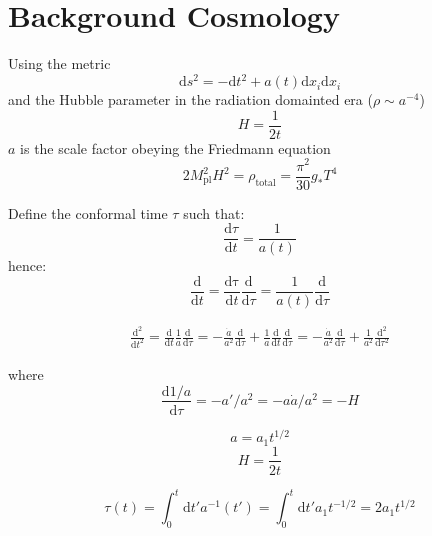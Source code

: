 \documentclass[a4paper]{article}
\begin{document}
\section{Background Cosmology}
Using the metric
\begin{equation}
    \mathrm{d}s^2 = -\mathrm{d}t^2 + a(t) \mathrm{d} x_i \mathrm{d} x_i
\end{equation}
and the Hubble parameter in the radiation domainted era ($\rho \sim a^{-4}$)
\begin{equation}
    H = \frac{1}{2t}
\end{equation}
$a$ is the scale factor obeying the Friedmann equation
\begin{equation}
    2 M_\mathrm{pl}^2 H^2 = \rho_\mathrm{total} = \frac{\pi^2}{30} g_* T^4
\end{equation}

Define the conformal time $\tau$ such that:
\begin{equation}
    \frac{\mathrm{d} \tau}{\mathrm{d} t} = \frac{1}{a(t)}
\end{equation}
hence:
\begin{equation}
    \frac{\mathrm{d}}{\mathrm{d} t} = \frac{\mathrm{d \tau}}{\mathrm{d} t} \frac{\mathrm{d}}{\mathrm{d} \tau} = \frac{1}{a(t)} \frac{\mathrm{d}}{\mathrm{d} \tau}
\end{equation}

\begin{align}
    \frac{\mathrm{d}^2}{\mathrm{d} t^2} = \frac{\mathrm{d}}{\mathrm{d} t} \frac{1}{a} \frac{\mathrm{d}}{\mathrm{d} \tau}
    = - \frac{\dot{a}}{a^2} \frac{\mathrm{d}}{\mathrm{d} \tau} + \frac{1}{a} \frac{\mathrm{d}}{\mathrm{d} t} \frac{\mathrm{d}}{\mathrm{d} \tau}
     = - \frac{\dot{a}}{a^2} \frac{\mathrm{d}}{\mathrm{d} \tau} + \frac{1}{a^2} \frac{\mathrm{d}^2}{\mathrm{d} \tau^2}
\end{align}

where
\begin{equation}
    \frac{\mathrm{d} 1/a}{\mathrm{d} \tau} = - a' / a^2 = - a \dot{a} / a^2 = - H
\end{equation}

\begin{equation}
    a = a_1 t^{1/2}
\end{equation}
\begin{equation}
    H = \frac{1}{2t}
\end{equation}

\begin{equation}
    \tau(t) = \int_0^t \mathrm{d} t' a^{-1}(t') = \int_0^t \mathrm{d} t' a_1 t^{-1/2} = 2 a_1 t^{1/2}
\end{equation}
\end{document}
